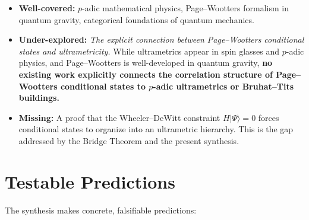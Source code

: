 \documentclass[12pt,a4paper]{article}
\theoremstyle{definition}
\newcommand{\ket}[1]{|#1\rangle}
\begin{document}
\begin{itemize}[nosep]
\item \textbf{Well-covered:} $p$-adic mathematical physics, Page--Wootters formalism in quantum gravity, categorical foundations of quantum mechanics.
\item \textbf{Under-explored:} \emph{The explicit connection between Page--Wootters conditional states and ultrametricity.} While ultrametrics appear in spin glasses and $p$-adic physics, and Page--Wootters is well-developed in quantum gravity, \textbf{no existing work explicitly connects the correlation structure of Page--Wootters conditional states to $p$-adic ultrametrics or Bruhat--Tits buildings.}
\item \textbf{Missing:} A proof that the Wheeler--DeWitt constraint $H\ket{\Psi}=0$ forces conditional states to organize into an ultrametric hierarchy. This is the gap addressed by the Bridge Theorem and the present synthesis.
\end{itemize}

\section{Testable Predictions}

The synthesis makes concrete, falsifiable predictions:
\end{document}
